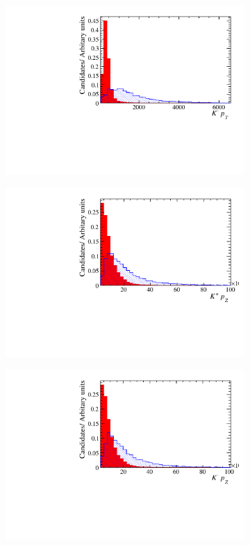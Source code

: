 \begin{figure}[!h]
\begin{subfigure}[t]{0.22\textwidth}
      \includegraphics[width=1.0\textwidth]{figs/Selection/Phi_BDT_Var_Ds2KKPi_Phi_K1_PT.pdf}
   \end{subfigure}
   \begin{subfigure}[t]{0.22\textwidth}
      \centering
      \includegraphics[width=1.0\textwidth]{figs/Selection/Phi_BDT_Var_Ds2KKPi_Phi_K0_PZ.pdf}
   \end{subfigure}
   \begin{subfigure}[t]{0.22\textwidth}
      \centering
      \includegraphics[width=1.0\textwidth]{figs/Selection/Phi_BDT_Var_Ds2KKPi_Phi_K1_PZ.pdf}

\end{subfigure}
\end{figure}
